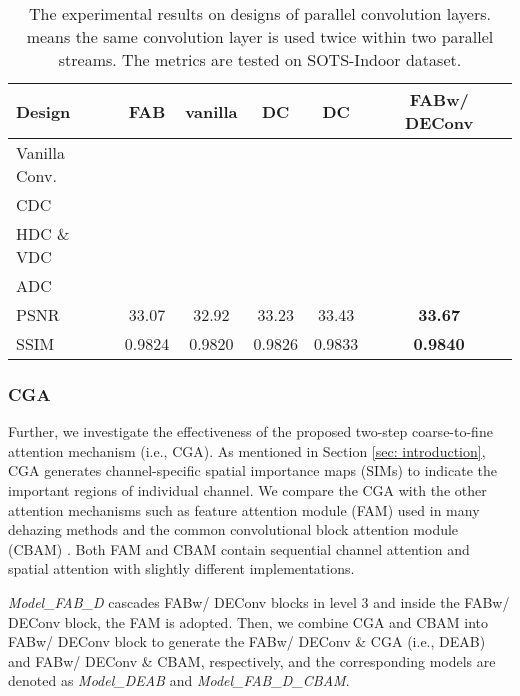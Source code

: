 \documentclass[lettersize,journal]{IEEEtran}
\begin{document}
\begin{table}[ht]
	\footnotesize
	\centering
	\caption{The experimental results on designs of parallel convolution layers. \CheckmarkBold \CheckmarkBold means the same convolution layer is used twice within two parallel streams. The metrics are tested on SOTS-Indoor \cite{li2018TIP} dataset.}
	\label{tab:deconv}	
	\begin{tabular}{l|ccccc}
		\toprule
		Design &FAB & vanilla & DC& DC &FAB{\tiny w/ DEConv} \\
		\midrule
		\midrule
		Vanilla Conv. & \CheckmarkBold &\CheckmarkBold \CheckmarkBold & \CheckmarkBold & \CheckmarkBold & \CheckmarkBold \\
		 CDC & && \CheckmarkBold & \CheckmarkBold & \CheckmarkBold \\
		 HDC \& VDC & && & \CheckmarkBold & \CheckmarkBold \\
		 ADC & && & & \CheckmarkBold \\
		\midrule
		PSNR & 33.07 & 32.92& 33.23 & 33.43 & \textbf{33.67} \\
		SSIM & 0.9824 & 0.9820 & 0.9826 & 0.9833 & \textbf{0.9840} \\
		\bottomrule
	\end{tabular}	
\end{table}







\subsubsection[2]{CGA}
Further, we investigate the effectiveness of the proposed two-step coarse-to-fine attention mechanism (i.e., CGA).
As mentioned in Section \ref{sec: introduction}, CGA generates channel-specific spatial importance maps (SIMs) to indicate the important regions of individual channel.
We compare the CGA with the other attention mechanisms such as feature attention module (FAM) used in many dehazing methods \cite{qin2020AAAI,wu2021CVPR,Wu2020CVPRW} and the common convolutional block attention module (CBAM) \cite{woo2018ECCV}.
Both FAM and CBAM contain sequential channel attention and spatial attention with slightly different implementations.


\textit{Model\_FAB\_D} cascades FAB{\tiny w/ DEConv} blocks in level 3 and inside the FAB{\tiny w/ DEConv} block, the FAM is adopted.
Then, we combine CGA and CBAM into FAB{\tiny w/ DEConv} block to generate the FAB{\tiny w/ DEConv \& CGA} (i.e., DEAB) and FAB{\tiny w/ DEConv \& CBAM}, respectively, and the corresponding models are denoted as \textit{Model\_DEAB} and \textit{Model\_FAB\_D\_CBAM}.
\end{document}
